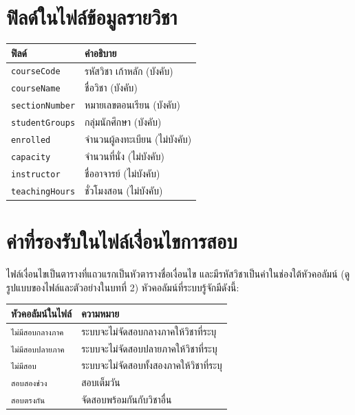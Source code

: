 \section{ฟิลด์ในไฟล์ข้อมูลรายวิชา}

\small
\begin{longtable}{L{4.5cm}L{10cm}}
\toprule
\textbf{ฟิลด์} & \textbf{คำอธิบาย} \\
\midrule
\texttt{courseCode} & รหัสวิชา เก้าหลัก (บังคับ) \\
\texttt{courseName} & ชื่อวิชา (บังคับ) \\
\texttt{sectionNumber} & หมายเลขตอนเรียน (บังคับ) \\
\texttt{studentGroups} & กลุ่มนักศึกษา (บังคับ) \\
\texttt{enrolled} & จำนวนผู้ลงทะเบียน (ไม่บังคับ) \\
\texttt{capacity} & จำนวนที่นั่ง (ไม่บังคับ) \\
\texttt{instructor} & ชื่ออาจารย์ (ไม่บังคับ) \\
\texttt{teachingHours} & ชั่วโมงสอน (ไม่บังคับ) \\
\bottomrule
\end{longtable}

\section{ค่าที่รองรับในไฟล์เงื่อนไขการสอบ}

ไฟล์เงื่อนไขเป็นตารางที่แถวแรกเป็นหัวตารางชื่อเงื่อนไข และมีรหัสวิชาเป็นค่าในช่องใต้หัวคอลัมน์
(ดูรูปแบบของไฟล์และตัวอย่างในบทที่ 2) หัวคอลัมน์ที่ระบบรู้จักมีดังนี้:

\small
\begin{longtable}{L{4.5cm}L{10cm}}
\toprule
\textbf{หัวคอลัมน์ในไฟล์} & \textbf{ความหมาย} \\
\midrule
\texttt{ไม่มีสอบกลางภาค} & ระบบจะไม่จัดสอบกลางภาคให้วิชาที่ระบุ \\
\texttt{ไม่มีสอบปลายภาค} & ระบบจะไม่จัดสอบปลายภาคให้วิชาที่ระบุ \\
\texttt{ไม่มีสอบ} & ระบบจะไม่จัดสอบทั้งสองภาคให้วิชาที่ระบุ \\
\texttt{สอบสองช่วง} & สอบเต็มวัน \\
\texttt{สอบตรงกัน} & จัดสอบพร้อมกันกับวิชาอื่น \\
\bottomrule
\end{longtable}

